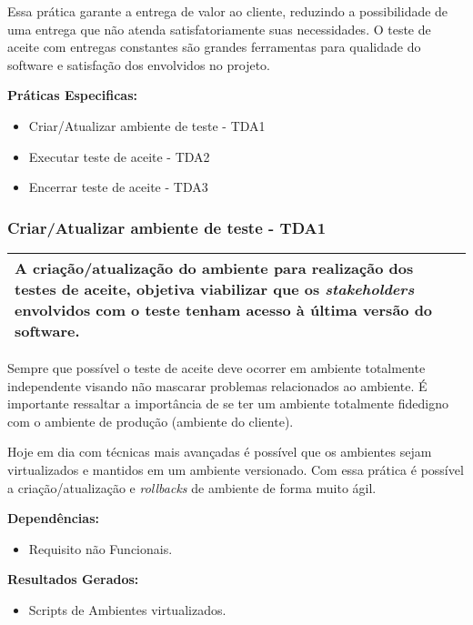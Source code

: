Essa prática garante a entrega de valor ao cliente, reduzindo a possibilidade de uma entrega que não atenda satisfatoriamente suas necessidades. O teste de aceite com entregas constantes são grandes ferramentas para qualidade do software e satisfação dos envolvidos no projeto.

\textbf{Práticas Especificas:}
\begin{itemize}
    \item  Criar/Atualizar ambiente de teste - TDA1
    \item  Executar teste de aceite - TDA2
    \item  Encerrar teste de aceite - TDA3
\end{itemize}


\subsubsection{Criar/Atualizar ambiente de teste - TDA1}
\label{sec:tda1}

\begin{table}[!ht]
\centering
\begin{tabular}{|p{130mm}|}
\hline
A criação/atualização do ambiente para realização dos testes de aceite, objetiva viabilizar que os \textit{stakeholders} envolvidos com o teste tenham acesso à última versão do software. \\ 
\hline
\end{tabular}
\end{table}

Sempre que possível o teste de aceite deve ocorrer em ambiente totalmente independente visando não mascarar problemas relacionados ao ambiente. É importante ressaltar a importância de se ter um ambiente totalmente fidedigno com o ambiente de produção (ambiente do cliente).

Hoje em dia com técnicas mais avançadas é possível que os ambientes sejam virtualizados e mantidos em um ambiente versionado. Com essa prática é possível a criação/atualização e \textit{rollbacks} de ambiente de forma muito ágil.

\textbf{Dependências: }
\begin{itemize}
    \item  Requisito não Funcionais.
\end{itemize}

\textbf{Resultados Gerados: }
\begin{itemize}
    \item  Scripts de Ambientes virtualizados.
\end{itemize}

